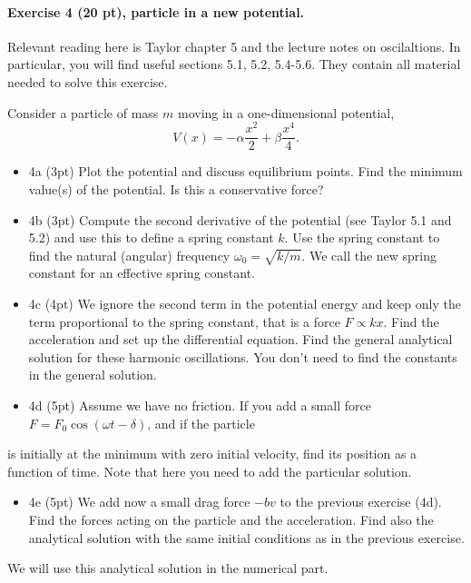 \documentclass[%
oneside,                 %
final,                   %
10pt]{article}
\begin{document}
\noindent
\paragraph{Exercise 4 (20 pt), particle in a new potential.}
Relevant reading here is Taylor chapter 5 and the lecture notes on oscilaltions. In particular, you will find useful  sections 5.1, 5.2, 5.4-5.6. They contain all material needed to solve this exercise.

Consider a particle of mass $m$ moving in a one-dimensional potential,
\[
V(x)=-\alpha\frac{x^2}{2}+\beta\frac{x^4}{4}.
\]

\begin{itemize}
\item 4a (3pt) Plot the potential and discuss equilibrium points. Find the minimum value(s) of the potential.  Is this a conservative force?

\item 4b (3pt) Compute the second derivative of the potential (see Taylor 5.1 and 5.2) and use this to define a spring constant $k$. Use the spring constant to find the natural (angular) frequency $\omega_0=\sqrt{k/m}$. We call the new spring constant for  an effective spring constant. 

\item 4c (4pt) We ignore the second term in the potential energy and keep only the term proportional to the spring constant, that is a force $F\propto kx$. Find the acceleration and set up the differential equation.  Find the general analytical solution for these harmonic oscillations.  You don't need to find the constants in the general solution.

\item 4d (5pt) Assume we have no friction. If you add a small force $F=F_0\cos{(\omega t-\delta)}$, and if the particle 
\end{itemize}

\noindent
is initially at the minimum with zero initial velocity, find its position as a function of time. Note that here you need to add the particular solution. 
\begin{itemize}
\item 4e (5pt) We add now  a small drag force $-bv$ to the previous exercise (4d). Find the forces acting on the particle and the acceleration. Find also the analytical solution with the same initial conditions as in the previous exercise.
\end{itemize}

\noindent
We will use this analytical solution in the numerical part.
\end{document}
